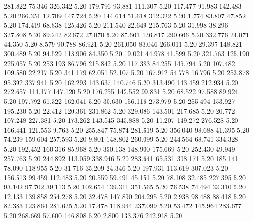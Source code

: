  281.822   75.346  326.342         5.20
 179.796   93.881  111.307         5.20
 117.477   91.983  142.483         5.20
 266.351   12.709  147.724         5.20
 144.614   51.618  312.322         5.20
   1.774   83.807   47.852         5.20
 174.419   68.838  125.426         5.20
 211.540   22.649  215.763         5.20
  31.998   38.296  327.808         5.20
  89.242   82.672   27.070         5.20
  87.661  126.817  290.666         5.20
 332.776   24.071   44.350         5.20
   8.579   90.788   86.921         5.20
 261.050   83.046  266.011         5.20
  29.397  148.821  300.489         5.20
  94.529  113.906   84.350         5.20
  19.021   44.978   41.599         5.20
 321.763  125.190  225.057         5.20
 253.193   86.796  215.842         5.20
 117.383   84.255  146.794         5.20
 107.482  109.580   22.217         5.20
 341.179   62.051   52.107         5.20
 167.912   54.778   16.796         5.20
 253.878   95.392  337.941         5.20
 162.293  143.637  140.746         5.20
 313.490  143.459  212.934         5.20
 272.657  114.177  147.120         5.20
 176.255  142.552   99.831         5.20
  68.522   97.588   89.924         5.20
 197.792   61.322  162.041         5.20
  30.630  156.116  273.979         5.20
 255.494  153.927  195.230         5.20
  22.412  120.361  231.862         5.20
 329.086  143.501  217.685         5.20
  20.772  107.248  227.381         5.20
 173.262  143.545  343.888         5.20
  11.207  149.272  276.528         5.20
 166.441  121.553    9.763         5.20
 255.847   75.874  281.619         5.20
 356.040   98.688   41.395         5.20
  74.239  159.604  257.593         5.20
   9.801  148.802  260.099         5.20
 244.564   68.741  334.328         5.20
 192.452  160.316   85.968         5.20
 350.138  148.900  175.669         5.20
 252.430   49.949  257.763         5.20
 244.892  113.059  338.946         5.20
 283.641   65.531  308.171         5.20
 185.141   78.090  118.955         5.20
  31.716   35.209   24.346         5.20
 197.931  113.619  307.023         5.20
 156.513   99.459  112.483         5.20
  20.559   59.491   45.151         5.20
  78.108   32.485  227.395         5.20
  93.102   97.702   39.113         5.20
 102.654  139.311  351.565         5.20
  76.538   74.494   33.310         5.20
  12.133  139.858  254.278         5.20
  32.478  147.890  204.295         5.20
   2.938   98.488   88.418         5.20
  82.383  123.864  281.625         5.20
  17.478  118.934  237.099         5.20
  53.472  145.964  283.677         5.20
 268.669   57.600  146.808         5.20
   2.800  133.376  242.918         5.20
